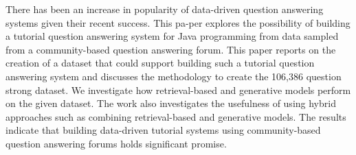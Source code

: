 There has been an increase in popularity of data-driven question answering systems given their recent success. This pa-per explores the possibility of building a tutorial question answering system for Java programming from data sampled from a community-based question answering forum. This paper reports on the creation of a dataset that could support building such a tutorial question answering system and discusses the methodology to create the 106,386 question strong dataset. We investigate how retrieval-based and generative models perform on the given dataset. The work also investigates the usefulness of using hybrid approaches such as combining retrieval-based and generative models. The results indicate that building data-driven tutorial systems using community-based question answering forums holds significant promise.
